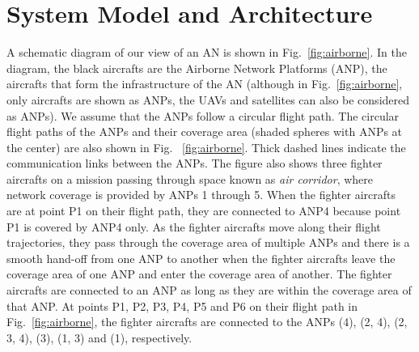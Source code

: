 \documentclass[10pt]{IEEEtran}
\begin{document}
\section{System Model and Architecture}
\label{sec:sysModel}
A schematic diagram of our view of an AN is shown in Fig.~\ref{fig:airborne}. In the diagram, the black aircrafts are the Airborne Network Platforms (ANP), the aircrafts that form the infrastructure of the AN (although in Fig.~\ref{fig:airborne}, only aircrafts are shown as ANPs,  the UAVs and satellites can also be considered as ANPs). We assume that the ANPs follow a circular flight path. The circular flight paths of the ANPs and their coverage area (shaded spheres with ANPs at the center) are also shown in Fig.~ \ref{fig:airborne}. Thick dashed lines indicate the communication links between the ANPs.  The figure also shows three fighter aircrafts on a mission passing through space known as {\em air corridor}, where network coverage is provided by ANPs 1 through 5. When the fighter aircrafts are at point P1 on their flight path, they are connected to ANP4 because point P1 is covered by ANP4 only. As the fighter aircrafts move along their flight trajectories, they pass through the coverage area of multiple ANPs and there is a smooth hand-off from one ANP to another when the fighter aircrafts leave the coverage area of one ANP and enter the coverage area of another. The fighter aircrafts are connected to an ANP as long as they are within the coverage area of that ANP. At points P1, P2, P3, P4, P5 and P6 on their flight path in Fig.~\ref{fig:airborne}, the fighter aircrafts are connected to the ANPs (4), (2, 4), (2, 3, 4), (3), (1, 3) and (1), respectively.
\end{document}
